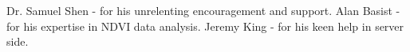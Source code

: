 \documentclass{sdsu-thesis}
\theoremstyle{dtm}
\begin{document}
\renewcommand*{\glsclearpage}{}
\begin{glossarypage}
  \centering
  \glsaddall\printglossary
\end{glossarypage}

\begin{acknowledgments}
Dr. Samuel Shen - for his unrelenting encouragement and support.
Alan Basist - for his expertise in NDVI data analysis.
Jeremy King - for his keen help in server side.
\end{acknowledgments}
%
%
% 
% 






% 
% 
% 



% 
% 
% 
\end{document}
